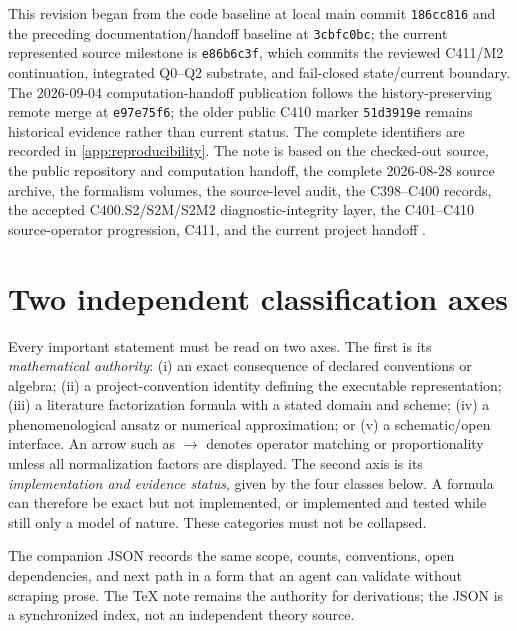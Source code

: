 \documentclass[11pt,oneside]{book}
\begin{document}
This revision began from the code baseline at local main commit \texttt{186cc816} and the preceding documentation/handoff baseline at \texttt{3cbfc0bc}; the current represented source milestone is \texttt{e86b6c3f}, which commits the reviewed C411/M2 continuation, integrated Q0--Q2 substrate, and fail-closed state/current boundary.  The 2026-09-04 computation-handoff publication follows the history-preserving remote merge at \texttt{e97e75f6}; the older public C410 marker \texttt{51d3919e} remains historical evidence rather than current status.  The complete identifiers are recorded in \cref{app:reproducibility}.  The note is based on the checked-out source, the public repository and computation handoff, the complete 2026-08-28 source archive, the formalism volumes, the source-level audit, the C398--C400 records, the accepted C400.S2/S2M/S2M2 diagnostic-integrity layer, the C401--C410 source-operator progression, C411, and the current project handoff \cite{DeuteronWignerRepo2026,DWGTMDTechnicalDraft2026,DWFormalVolumes2026,DWSourceAudit2026,DWC398Record2026,DWC399Record2026,DWC400ScienceLock2026,DWC400P1Record2026,DWC400S2Record2026,DWC401C410Record2026,DWC411Record2026,DWCurrentHandoff2026}.

\section*{Two independent classification axes}

Every important statement must be read on two axes.  The first is its \emph{mathematical authority}: (i) an exact consequence of declared conventions or algebra; (ii) a project-convention identity defining the executable representation; (iii) a literature factorization formula with a stated domain and scheme; (iv) a phenomenological ansatz or numerical approximation; or (v) a schematic/open interface.  An arrow such as $\longrightarrow$ denotes operator matching or proportionality unless all normalization factors are displayed.  The second axis is its \emph{implementation and evidence status}, given by the four classes below.  A formula can therefore be exact but not implemented, or implemented and tested while still only a model of nature.  These categories must not be collapsed.

The companion JSON records the same scope, counts, conventions, open dependencies, and next path in a form that an agent can validate without scraping prose.  The \TeX{} note remains the authority for derivations; the JSON is a synchronized index, not an independent theory source.
\end{document}
